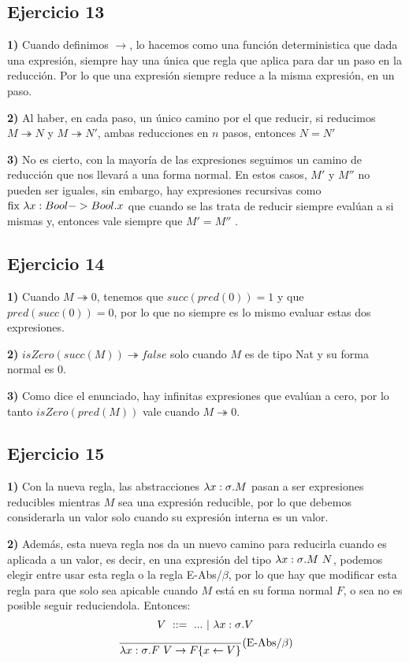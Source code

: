 \documentclass[10pt,a4paper, landscape]{article}
\begin{document}
\vspace*{5mm}
\begin{multicols}{2}
\subsection{Ejercicio 13}
\textbf{1) }Cuando definimos $\to$, lo hacemos como una función deterministica que dada una expresión, siempre hay una única que regla que aplica para dar un paso en la reducción. Por lo que una expresión siempre reduce a la misma expresión, en un paso.

\textbf{2) } Al haber, en cada paso, un único camino por el que reducir, si reducimos $M\twoheadrightarrow N$ y $M\twoheadrightarrow N'$, ambas reducciones en $n$ pasos, entonces $N = N'$

\textbf{3)} No es cierto, con la mayoría de las expresiones seguimos un camino de reducción que nos llevará a una forma normal. En estos casos, $M'$ y $M''$ no pueden ser iguales, sin embargo, hay expresiones recursivas como $\text{fix } \lambda x: Bool->Bool \text{.} x$ que cuando se las trata de reducir siempre evalúan a si mismas y, entonces vale siempre que $M' = M''$ .

\subsection{Ejercicio 14}
\textbf{1)} Cuando $M \twoheadrightarrow 0$, tenemos que $succ(pred(0)) = 1$ y que $pred(succ(0)) = 0$, por lo que no siempre es lo mismo evaluar estas dos expresiones. 

\textbf{2)} $isZero(succ(M))\twoheadrightarrow false$ solo cuando $M$ es de tipo Nat y su forma normal es $0$. 

\textbf{3)} Como dice el enunciado, hay infinitas expresiones que evalúan a cero, por lo tanto $isZero(pred(M))$ vale cuando $M\twoheadrightarrow 0$.

\subsection{Ejercicio 15}
\textbf{1)} Con la nueva regla, las abstracciones $\lambda x: \sigma \text{.} M$ pasan a ser expresiones reducibles mientras $M$ sea una expresión reducible, por lo que debemos considerarla un valor solo cuando su expresión interna es un valor.

\textbf{2)} Además, esta nueva regla nos da un nuevo camino para reducirla cuando es aplicada a un valor, es decir, en una expresión del tipo $\lambda x: \sigma \text{.} M~N$, podemos elegir entre usar esta regla o la regla E-Abs/$\beta$, por lo que hay que modificar esta regla para que solo sea apicable cuando $M$ está en su forma normal $F$, o sea no es posible seguir reduciendola. Entonces:
$$V~::=~ ...~|~\lambda x: \sigma \text{.} V$$
$$\frac{}{\lambda x: \sigma \text{.} F~V\to F\{x\leftarrow V\}}(\text{E-Abs/}\beta)$$


\end{multicols}
\end{document}
